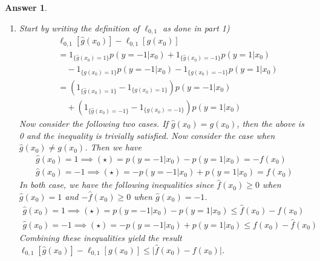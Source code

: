 \documentclass[12pt]{article}
\theoremstyle{colon}
\newtheorem*{answer}{Answer}
\begin{document}
\begin{answer}
\begin{enumerate}[label=\arabic*)]
    \item Start by writing the definition of $\ell_{0,1}$ as done in part 1)
      \begin{align*}
        & \ell_{0,1}[\widehat{g}(x_0)] - \ell_{0,1}[g(x_0)] \\
        &= 1_{\{ \widehat{g}(x_0)= 1 \}}p(y = -1 | x_0) + 1_{\{ \widehat{g}(x_0)= -1 \}}p(y = 1 | x_0) \\
        &\quad - 1_{\{ g(x_0)= 1 \}}p(y = -1 | x_0) - 1_{\{ g(x_0)= -1 \}}p(y = 1 | x_0) \\
        &= (1_{\{ \widehat{g}(x_0)= 1 \}} - 1_{\{ g(x_0)= 1 \}})p(y = -1 | x_0) \\
        &\quad + (1_{\{ \widehat{g}(x_0)= -1 \}} - 1_{\{ g(x_0)= -1 \}})p(y = 1 | x_0) \tag{$\star$}
      \end{align*}
      Now consider the following two cases. If $\widehat{g}(x_0) = g(x_0)$, then the above is 0 and the inequality is trivially satisfied. Now consider the case when $\widehat{g}(x_0) \neq g(x_0)$. Then we have
      \begin{gather*}
          \widehat{g}(x_0) = 1 \implies (\star) = p(y = -1 | x_0) - p(y = 1 | x_0) = -f(x_0) \\
          \widehat{g}(x_0) = -1 \implies (\star) = - p(y = -1 | x_0) + p(y = 1 | x_0) = f(x_0)
      \end{gather*}
      In both case, we have the following inequalities since $\widehat{f}(x_0) \geq 0$ when $\widehat{g}(x_0) = 1$ and $-\widehat{f}(x_0) \geq 0$ when $\widehat{g}(x_0) = -1$.
      \begin{gather*}
          \widehat{g}(x_0) = 1 \implies (\star) = p(y = -1 | x_0) - p(y = 1 | x_0) \leq \widehat{f}(x_0) - f(x_0) \\
          \widehat{g}(x_0) = -1 \implies (\star) = - p(y = -1 | x_0) + p(y = 1 | x_0) \leq f(x_0) - \widehat{f}(x_0)
      \end{gather*}
      Combining these inequalities yield the result $\ell_{0,1}[\widehat{g}(x_0)] - \ell_{0,1}[g(x_0)] \leq \lvert \widehat{f}(x_0) - f(x_0) \rvert$.


\end{enumerate}
\end{answer}
\end{document}
